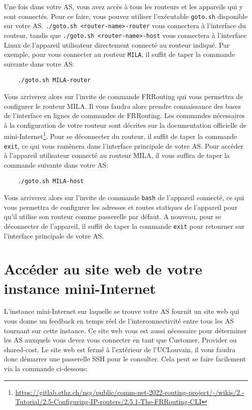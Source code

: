 \documentclass[a4paper, 11pt]{article}
\begin{document}
Une fois dans votre AS, vous avez accès à tous les routeurs et les
appareils qui y sont connectés. Pour ce faire, vous pouvez utiliser
l'exécutable \texttt{goto.sh} disponible sur votre AS.
\texttt{./goto.sh <router-name>-router} vous connectera à l'interface
du routeur, tandis que \texttt{./goto.sh <router-name>-host} vous
connectera à l'interface Linux de l'appareil utilisateur directement
connecté au routeur indiqué.
Par exemple, pour vous connecter au routeur \texttt{MILA}, il suffit
de taper la commande suivante dans votre AS:

\begin{verbatim}
    ./goto.sh MILA-router
\end{verbatim}


Vous arriverez alors sur l'invite de commande FRRouting qui vous
permettra de configurer le routeur MILA.
Il vous faudra alors prendre connaissance des bases de l'interface
en lignes de commandes de FRRouting. Les commandes nécessaires
à la configuration de votre routeur sont décrites sur la documentation
officielle de 
mini-Internet\footnote{\url{https://gitlab.ethz.ch/nsg/public/comm-net-2022-routing-project/-/wikis/2.-Tutorial/2.5-Configuring-IP-routers/2.5.1-The-FRRouting-CLI}}.
Pour se déconnecter du
routeur, il suffit de taper la commande \texttt{exit}, ce qui vous
ramènera dans l'interface principale de votre AS.
Pour accéder à l'appareil utilisateur connecté au routeur MILA, il vous
suffira de taper la commande suivante dans votre AS:

\begin{verbatim}
    ./goto.sh MILA-host
\end{verbatim}

Vous arriverez alors sur l'invite de commande \texttt{bash} de l'appareil
connecté, ce qui vous permettra de configurer les adresses et routes
statiques de l'appareil pour qu'il utilise son routeur comme
passerelle par défaut. A nouveau, pour se déconnecter de l'appareil,
il suffit de taper la commande \texttt{exit} pour retourner sur
l'interface principale de votre AS.

\section{Accéder au site web de votre instance mini-Internet}

L'instance mini-Internet sur laquelle se trouve votre AS fournit un site
web qui vous donne un feedback en temps réel de l'interconnectivité
entre tous les AS tournant sur cette instance. Ce site web vous est aussi
nécessaire pour déterminer les AS auxquels vous devez vous connecter
en tant que Customer, Provider ou shared-cost. Le site web est fermé
à l'extérieur de l'UCLouvain, il vous faudra donc démarrer une passerelle
SSH pour le consulter. Cela peut se faire facilement via la commande
ci-dessous:
\end{document}
